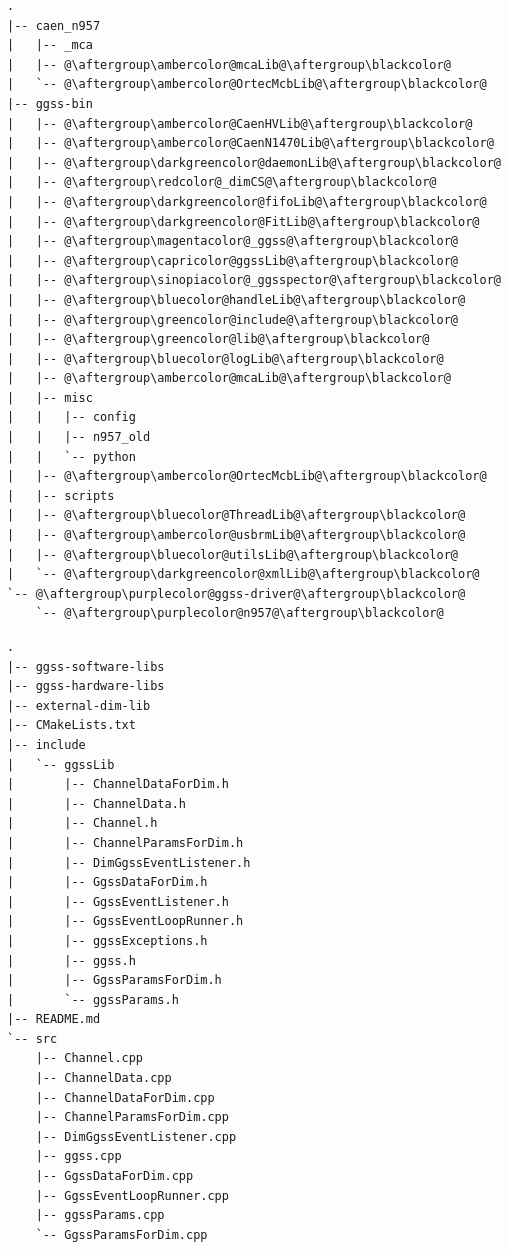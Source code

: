 \newpage

\begin{lstlisting}[language=Cmd, caption={Pierwotna struktura katalogów}, escapechar=@]
.
|-- caen_n957
|   |-- _mca
|   |-- @\aftergroup\ambercolor@mcaLib@\aftergroup\blackcolor@
|   `-- @\aftergroup\ambercolor@OrtecMcbLib@\aftergroup\blackcolor@
|-- ggss-bin
|   |-- @\aftergroup\ambercolor@CaenHVLib@\aftergroup\blackcolor@
|   |-- @\aftergroup\ambercolor@CaenN1470Lib@\aftergroup\blackcolor@
|   |-- @\aftergroup\darkgreencolor@daemonLib@\aftergroup\blackcolor@
|   |-- @\aftergroup\redcolor@_dimCS@\aftergroup\blackcolor@
|   |-- @\aftergroup\darkgreencolor@fifoLib@\aftergroup\blackcolor@
|   |-- @\aftergroup\darkgreencolor@FitLib@\aftergroup\blackcolor@
|   |-- @\aftergroup\magentacolor@_ggss@\aftergroup\blackcolor@
|   |-- @\aftergroup\capricolor@ggssLib@\aftergroup\blackcolor@
|   |-- @\aftergroup\sinopiacolor@_ggsspector@\aftergroup\blackcolor@
|   |-- @\aftergroup\bluecolor@handleLib@\aftergroup\blackcolor@
|   |-- @\aftergroup\greencolor@include@\aftergroup\blackcolor@
|   |-- @\aftergroup\greencolor@lib@\aftergroup\blackcolor@
|   |-- @\aftergroup\bluecolor@logLib@\aftergroup\blackcolor@
|   |-- @\aftergroup\ambercolor@mcaLib@\aftergroup\blackcolor@
|   |-- misc
|   |   |-- config
|   |   |-- n957_old
|   |   `-- python
|   |-- @\aftergroup\ambercolor@OrtecMcbLib@\aftergroup\blackcolor@
|   |-- scripts
|   |-- @\aftergroup\bluecolor@ThreadLib@\aftergroup\blackcolor@
|   |-- @\aftergroup\ambercolor@usbrmLib@\aftergroup\blackcolor@
|   |-- @\aftergroup\bluecolor@utilsLib@\aftergroup\blackcolor@
|   `-- @\aftergroup\darkgreencolor@xmlLib@\aftergroup\blackcolor@
`-- @\aftergroup\purplecolor@ggss-driver@\aftergroup\blackcolor@
    `-- @\aftergroup\purplecolor@n957@\aftergroup\blackcolor@
\end{lstlisting}


\onecolumn

\newpage

\twocolumn

\begin{lstlisting}
.
|-- ggss-software-libs
|-- ggss-hardware-libs
|-- external-dim-lib
|-- CMakeLists.txt
|-- include
|   `-- ggssLib
|       |-- ChannelDataForDim.h
|       |-- ChannelData.h
|       |-- Channel.h
|       |-- ChannelParamsForDim.h
|       |-- DimGgssEventListener.h
|       |-- GgssDataForDim.h
|       |-- GgssEventListener.h
|       |-- GgssEventLoopRunner.h
|       |-- ggssExceptions.h
|       |-- ggss.h
|       |-- GgssParamsForDim.h
|       `-- ggssParams.h
|-- README.md
`-- src
    |-- Channel.cpp
    |-- ChannelData.cpp
    |-- ChannelDataForDim.cpp
    |-- ChannelParamsForDim.cpp
    |-- DimGgssEventListener.cpp
    |-- ggss.cpp
    |-- GgssDataForDim.cpp
    |-- GgssEventLoopRunner.cpp
    |-- ggssParams.cpp
    `-- GgssParamsForDim.cpp

\end{lstlisting}

